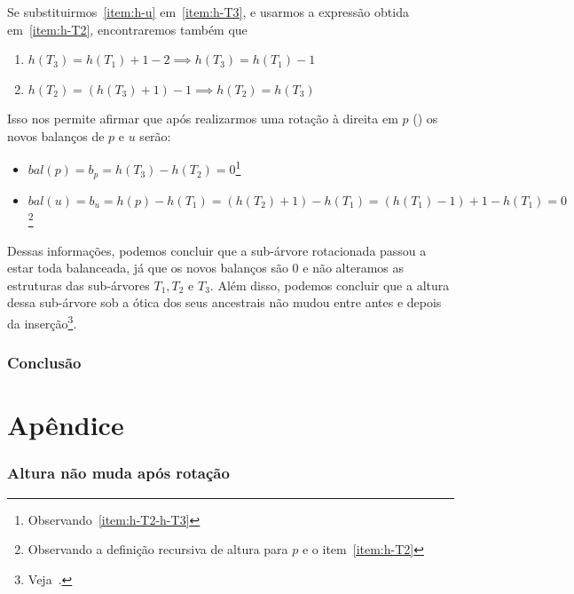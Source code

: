 \documentclass[11pt,twoside]{article}
\theoremstyle{definition}
\begin{document}
Se substituirmos~\ref{item:h-u} em~\ref{item:h-T3}, e usarmos a expressão obtida em~\ref{item:h-T2}, encontraremos também que
\begin{enumerate}[resume, label={\Roman*.}]
	\item \( h(T_3) = h(T_1) + 1 - 2 \implies h(T_3) = h(T_1) - 1 \)
	\item \label{item:h-T2-h-T3} \( h(T_2) = (h(T_3) + 1) - 1 \implies h(T_2) = h(T_3) \)
\end{enumerate}

Isso nos permite afirmar que após realizarmos uma rotação à direita em \( p \) () os novos balanços de \( p \) e \( u \) serão:
\begin{itemize}
	\item \( bal(p) = b_p = h(T_3) - h(T_2) = 0 \)\footnote{Observando~\ref{item:h-T2-h-T3}}
	\item \( bal(u) = b_u = h(p) - h(T_1) = (h(T_2) + 1) - h(T_1) = (h(T_1) - 1) + 1 - h(T_1) = 0 \)\footnote{Observando a definição recursiva de altura para \( p \) e o item~\ref{item:h-T2}}
\end{itemize}

\begin{figure}[hbt]
	\caption{\label{fig:ins-rot-dir-post}}
	\centering
	
\end{figure}

Dessas informações, podemos concluir que a sub-árvore rotacionada passou a estar toda balanceada, já que os novos balanços são 0 e não alteramos as estruturas das sub-árvores \( T_1, T_2 \) e \( T_3 \). Além disso, podemos concluir que a altura dessa sub-árvore sob a ótica dos seus ancestrais não mudou entre antes e depois da inserção\footnote{Veja~.}.

\section{Conclusão}


\part*{Apêndice}

\section{Altura não muda após rotação}
\label{block:altura-nao-muda}


\end{document}
